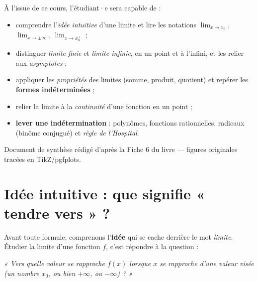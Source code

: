 \documentclass[11pt,a4paper]{article}
\begin{document}
\begin{tcolorbox}[boxbase,colback=primary!5,colframe=primary,width=15cm,
    title={\textsc{Objectifs pédagogiques de la fiche}}]
À l'issue de ce cours, l'étudiant·e sera capable de :
\begin{itemize}[leftmargin=1.6em,topsep=2pt,itemsep=1pt]
  \item comprendre l'\emph{idée intuitive} d'une limite et lire les notations $\displaystyle\lim_{x\to x_0}$, $\displaystyle\lim_{x\to\pm\infty}$, $\lim_{x\to x_0^{\pm}}$ ;
  \item distinguer \emph{limite finie} et \emph{limite infinie}, en un point et à l'infini, et les relier aux \emph{asymptotes} ;
  \item appliquer les \emph{propriétés} des limites (somme, produit, quotient) et repérer les \textbf{formes indéterminées} ;
  \item relier la limite à la \emph{continuité} d'une fonction en un point ;
  \item \textbf{lever une indétermination} : polynômes, fonctions rationnelles, radicaux (binôme conjugué) et \emph{règle de l'Hospital}.
\end{itemize}
\end{tcolorbox}

\vspace{0.6cm}
{\small\color{black!60} Document de synthèse rédigé d'après la Fiche 6 du livre — figures originales tracées en TikZ/pgfplots.}
\par
\endgroup

\newpage
\renewcommand{\contentsname}{\textcolor{primarydark}{Table des matières}}
\tableofcontents
\thispagestyle{fancy}
\newpage

\section{Idée intuitive : que signifie « tendre vers » ?}
Avant toute formule, comprenons l'\textbf{idée} qui se cache derrière le mot \emph{limite}.
Étudier la limite d'une fonction $f$, c'est répondre à la question :

\begin{center}
\itshape « Vers quelle valeur se rapproche $f(x)$ lorsque $x$ se rapproche d'une valeur visée
(un nombre $x_0$, ou bien $+\infty$, ou $-\infty$) ? »
\end{center}
\end{document}
